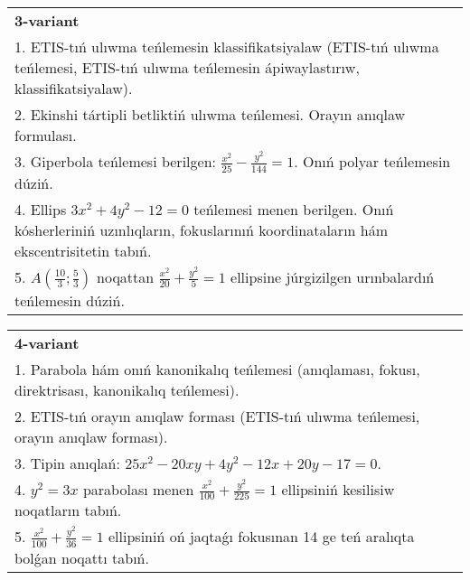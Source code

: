 \documentclass{article}
\begin{document}
\begin{tabular}{m{17cm}}
\textbf{3-variant}\\
1. ETIS-tıń ulıwma teńlemesin klassifikatsiyalaw (ETIS-tıń ulıwma teńlemesi, ETIS-tıń ulıwma teńlemesin ápiwaylastırıw, klassifikatsiyalaw).\\

2. Ekinshi tártipli betliktiń ulıwma teńlemesi. Orayın anıqlaw formulası.\\

3. Giperbola teńlemesi berilgen: $\frac{x^{2}}{25}-\frac{y^{2}}{144}=1$. Onıń polyar teńlemesin dúziń.\\

4. Ellips $3x^{2} + 4y^{2} - 12 = 0$ teńlemesi menen berilgen. Onıń kósherleriniń uzınlıqların, fokuslarınıń koordinataların hám ekscentrisitetin tabıń.  \\

5. $A(\frac{10}{3};\frac{5}{3})$ noqattan $\frac{x^{2}}{20} + \frac{y^{2}}{5} = 1$ ellipsine júrgizilgen urınbalardıń teńlemesin dúziń.  
\end{tabular}
\vspace{1cm}


\begin{tabular}{m{17cm}}
\textbf{4-variant}\\
1. Parabola hám onıń kanonikalıq teńlemesi (anıqlaması, fokusı, direktrisası, kanonikalıq teńlemesi).\\

2. ETIS-tıń orayın anıqlaw forması (ETIS-tıń ulıwma teńlemesi, orayın anıqlaw forması).\\

3. Tipin anıqlań: $25 x^{2}-20 xy+4 y^{2}-12 x+20 y-17=0$.\\

4. $y^{2} = 3x$ parabolası menen $\frac{x^{2}}{100} + \frac{y^{2}}{225} = 1$ ellipsiniń kesilisiw noqatların tabıń.  \\

5. $\frac{x^{2}}{100} + \frac{y^{2}}{36} = 1$ ellipsiniń oń jaqtaǵı fokusınan 14 ge teń aralıqta bolǵan noqattı tabıń.  
\end{tabular}
\vspace{1cm}
\end{document}
